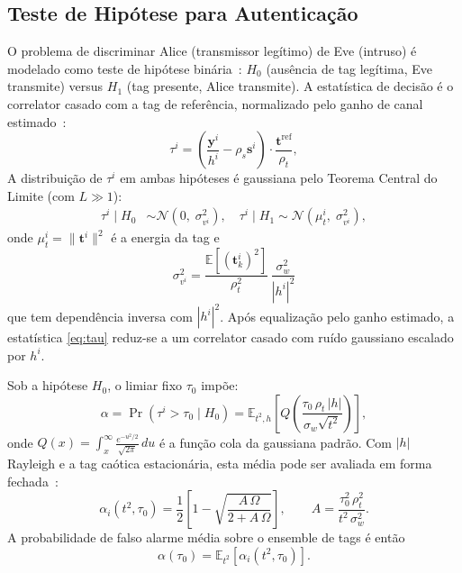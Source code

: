 \documentclass{sbrt}
\begin{document}
\subsection{Teste de Hipótese para Autenticação}\label{sec:hip}

O problema de discriminar Alice (transmissor legítimo) de Eve (intruso) é modelado como teste de hipótese binária~\cite{ref_poor}: $H_0$ (ausência de tag legítima, Eve transmite) versus $H_1$ (tag presente, Alice transmite). A estatística de decisão é o correlator casado com a tag de referência, normalizado pelo ganho de canal estimado~\cite{ref_xie}:
\begin{equation}\label{eq:tau}
    \tau^i = \left(\frac{\mathbf{y}^i}{h^i} - \rho_s \mathbf{s}^i\right) \cdot \frac{\mathbf{t}^{\mathrm{ref}}}{\rho_t},
\end{equation}
A distribuição de $\tau^i$ em ambas hipóteses é gaussiana pelo Teorema Central do Limite (com $L \gg 1$):
\begin{align}
    \tau^i \mid H_0 &\sim \mathcal{N}\!\left(0,\; \sigma_{v^i}^2\right),\quad
    \tau^i \mid H_1 \sim \mathcal{N}\!\left(\mu_{t}^i,\; \sigma_{v^i}^2\right), \label{eq:dists}
\end{align}
onde $\mu_t^i = \|\mathbf{t}^i\|^2$ é a energia da tag e
\begin{equation}\label{eq:var_v}
    \sigma_{v^i}^2 = \frac{\mathbb{E}[(\mathbf{t}^i_k)^2]}{\rho_t^2}\,\frac{\sigma_w^2}{|h^i|^2}
\end{equation}
que tem dependência inversa com $|h^i|^2$. Após equalização pelo ganho estimado, a estatística \eqref{eq:tau} reduz-se a um correlator casado com ruído gaussiano escalado por $h^i$.

Sob a hipótese $H_0$, o limiar fixo $\tau_0$ impõe:
\begin{equation}\label{eq:alpha_def}
    \alpha = \Pr(\tau^i > \tau_0 \mid H_0) = \mathbb{E}_{t^2,h}\left[Q\left(\frac{\tau_0\,\rho_t\,|h|}{\sigma_w\sqrt{t^2}}\right)\right],
\end{equation}
onde $Q(x)=\int_x^{\infty} \frac{e^{-u^2/2}}{\sqrt{2\pi}}\,du$ é a função cola da gaussiana padrão. Com $|h|$ Rayleigh e a tag caótica estacionária, esta média pode ser avaliada em forma fechada~\cite{ref_poor}:
\begin{equation}\label{eq:alpha_rayleigh_closed}
    \alpha_i(t^2,\tau_0) = \frac{1}{2}\left[1 - \sqrt{\frac{A\,\Omega}{2 + A\,\Omega}}\right],
    \qquad A = \frac{\tau_0^2\,\rho_t^2}{t^2\,\sigma_w^2}.
\end{equation}
A probabilidade de falso alarme média sobre o ensemble de tags é então
\begin{equation}\label{eq:alpha_avg}
    \alpha(\tau_0) = \mathbb{E}_{t^2}\left[\alpha_i(t^2,\tau_0)\right].
\end{equation}
\end{document}
